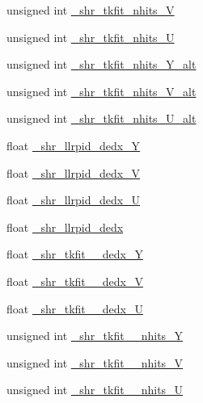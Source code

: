 \begin{DoxyCompactItemize}
unsigned int \hyperlink{classselection_1_1CC0piNpSelection_adab23c54dd799cdf83c31a10e4ae9061}{\+\_\+shr\+\_\+tkfit\+\_\+nhits\+\_\+V}
\item 
unsigned int \hyperlink{classselection_1_1CC0piNpSelection_a6c75f5783174133ce97849f128f3dee3}{\+\_\+shr\+\_\+tkfit\+\_\+nhits\+\_\+U}
\item 
unsigned int \hyperlink{classselection_1_1CC0piNpSelection_ae147f3006253b7689636993c76221f21}{\+\_\+shr\+\_\+tkfit\+\_\+nhits\+\_\+\+Y\+\_\+alt}
\item 
unsigned int \hyperlink{classselection_1_1CC0piNpSelection_abd57bba0cf3b1c9268afc03e8713df13}{\+\_\+shr\+\_\+tkfit\+\_\+nhits\+\_\+\+V\+\_\+alt}
\item 
unsigned int \hyperlink{classselection_1_1CC0piNpSelection_a2a432bd36ae5dc824470183ca6621218}{\+\_\+shr\+\_\+tkfit\+\_\+nhits\+\_\+\+U\+\_\+alt}
\item 
float \hyperlink{classselection_1_1CC0piNpSelection_a17acfa1b5d6a4d3f5c382c3f320fda83}{\+\_\+shr\+\_\+llrpid\+\_\+dedx\+\_\+Y}
\item 
float \hyperlink{classselection_1_1CC0piNpSelection_af27b6e10cdab2cb2b5c07bfcf7a8e491}{\+\_\+shr\+\_\+llrpid\+\_\+dedx\+\_\+V}
\item 
float \hyperlink{classselection_1_1CC0piNpSelection_a30e6e7359995cc9ddb52db719cd4064e}{\+\_\+shr\+\_\+llrpid\+\_\+dedx\+\_\+U}
\item 
float \hyperlink{classselection_1_1CC0piNpSelection_a69fe01c749c1be00582e7c1cf27ced22}{\+\_\+shr\+\_\+llrpid\+\_\+dedx}
\item 
float \hyperlink{classselection_1_1CC0piNpSelection_a3fce1b66b45df22120481d91b16957ba}{\+\_\+shr\+\_\+tkfit\+\_\+2cm\+\_\+dedx\+\_\+Y}
\item 
float \hyperlink{classselection_1_1CC0piNpSelection_a02be9f071fa5ee210e34b5914d428591}{\+\_\+shr\+\_\+tkfit\+\_\+2cm\+\_\+dedx\+\_\+V}
\item 
float \hyperlink{classselection_1_1CC0piNpSelection_a2ae6bb1925bd4f20deb1427c2bde2674}{\+\_\+shr\+\_\+tkfit\+\_\+2cm\+\_\+dedx\+\_\+U}
\item 
unsigned int \hyperlink{classselection_1_1CC0piNpSelection_a267f9073fa07d7c1c5e40b79a935c585}{\+\_\+shr\+\_\+tkfit\+\_\+2cm\+\_\+nhits\+\_\+Y}
\item 
unsigned int \hyperlink{classselection_1_1CC0piNpSelection_a4d79a5a52fba98286c68079f9a3e04cb}{\+\_\+shr\+\_\+tkfit\+\_\+2cm\+\_\+nhits\+\_\+V}
\item 
unsigned int \hyperlink{classselection_1_1CC0piNpSelection_ab659c0c62a77c77e745829478828e100}{\+\_\+shr\+\_\+tkfit\+\_\+2cm\+\_\+nhits\+\_\+U}

\end{DoxyCompactItemize}
